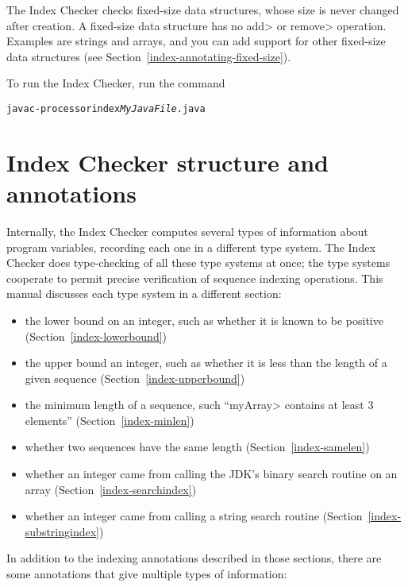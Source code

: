 The Index Checker checks fixed-size data structures, whose size is never
changed after creation.  A fixed-size data structure has no \<add> or
\<remove> operation.  Examples are strings and arrays, and you can add
support for other fixed-size data structures (see
Section~\ref{index-annotating-fixed-size}).

To run the Index Checker, run the command

\begin{alltt}
  javac -processor index \emph{MyJavaFile}.java
\end{alltt}


\section{Index Checker structure and annotations\label{index-annotations}}

Internally, the Index Checker computes several types of information about
program variables, recording each one in a different type system.  The
Index Checker does type-checking of all these type systems at once; the
type systems cooperate to permit precise verification of sequence indexing
operations.  This manual discusses each type system in a different
section:
\begin{itemize}
\item
  the lower bound on an integer, such as whether it is known to be positive
  (Section~\ref{index-lowerbound})
\item
  the upper bound an integer, such as whether it is less than the length
  of a given sequence (Section~\ref{index-upperbound})
\item
  the minimum length of a sequence, such ``\<myArray> contains at least 3
  elements'' (Section~\ref{index-minlen})
\item
  whether two sequences have the same length (Section~\ref{index-samelen})
\item
  whether an integer came from calling the JDK's binary search routine on
  an array (Section~\ref{index-searchindex})
\item
  whether an integer came from calling a string search routine
  (Section~\ref{index-substringindex})
\end{itemize}

In addition to the indexing annotations described in those sections, there
are some annotations that give multiple types of information:

